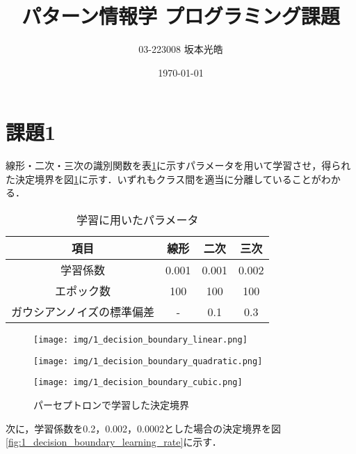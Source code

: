 \documentclass[a4paper,12pt]{jsarticle}
\title{パターン情報学 プログラミング課題}
\author{03-223008 坂本光皓}
\date{\today}
\begin{document}
\maketitle

\section{課題1}
線形・二次・三次の識別関数を表\ref{table:1_parameter}に示すパラメータを用いて学習させ，得られた決定境界を図\ref{fig:1_decision_boundary}に示す．いずれもクラス間を適当に分離していることがわかる．

\begin{table}[htbp]
  \centering
  \caption{学習に用いたパラメータ}
  \label{table:1_parameter}
  \begin{tabular}{cccc}
    \toprule
    項目            & 線形    & 二次    & 三次    \\
    \midrule
    学習係数          & 0.001 & 0.001 & 0.002 \\
    エポック数         & 100   & 100   & 100   \\
    ガウシアンノイズの標準偏差 & -     & 0.1   & 0.3   \\
    \bottomrule
  \end{tabular}
\end{table}

\begin{figure}[htbp]
  \centering
  \begin{minipage}[b]{0.325\linewidth}
    \centering
    \texttt{[image: img/1\_decision\_boundary\_linear.png]}
    \label{fig:1_decision_boundary_linear}
  \end{minipage}
  \begin{minipage}[b]{0.325\linewidth}
    \centering
    \texttt{[image: img/1\_decision\_boundary\_quadratic.png]}
    \label{fig:1_decision_boundary_quadratic}
  \end{minipage}
  \begin{minipage}[b]{0.325\linewidth}
    \centering
    \texttt{[image: img/1\_decision\_boundary\_cubic.png]}
    \label{fig:1_decision_boundary_cubic}
  \end{minipage}
  \caption{パーセプトロンで学習した決定境界}
  \label{fig:1_decision_boundary}
\end{figure}

次に，学習係数を0.2，0.002，0.0002とした場合の決定境界を図\ref{fig:1_decision_boundary_learning_rate}に示す．
\end{document}

